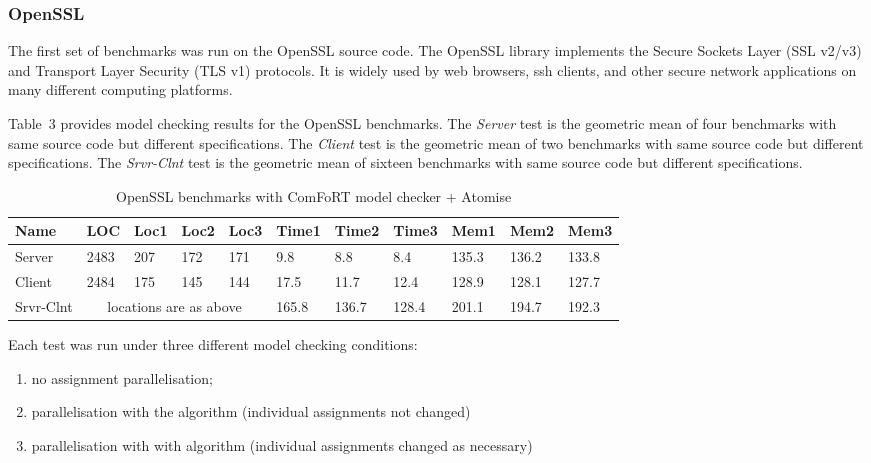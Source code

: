 \subsubsection{OpenSSL}

The first set of benchmarks was run on the OpenSSL source code.  The
OpenSSL library implements the Secure Sockets Layer (SSL v2/v3) and
Transport Layer Security (TLS v1) protocols. It is widely used by web
browsers, ssh clients, and other secure network applications on many
different computing platforms.

Table~3 provides model checking results for the OpenSSL
benchmarks.  The \emph{Server} test is the geometric mean of four
benchmarks with same source code but different specifications.  The
\emph{Client} test is the geometric mean of two benchmarks with same
source code but different specifications.  The \emph{Srvr-Clnt} test
is the geometric mean of sixteen benchmarks with same source code but
different specifications.

\begin{table}
\begin{scriptsize}
\begin{tabular}{|l|l|l|l|l|l|l|l|l|l|l|} \hline
Name & LOC & Loc1 & Loc2 & Loc3 & Time1 & Time2 & Time3 & Mem1 & Mem2
& Mem3 \\ \hline
Server & 2483 & 207 & 172 & 171 & 9.8 & 8.8 & 8.4 & 135.3 & 136.2 &
133.8\\ \hline
Client & 2484 & 175 & 145 & 144 & 17.5 & 11.7 & 12.4 & 128.9 & 128.1 &
127.7\\ \hline
Srvr-Clnt & \multicolumn{4}{|c|}{locations are as above} & 165.8 & 136.7
& 128.4 & 201.1 & 194.7 & 192.3\\ \hline
\end{tabular}
\label{openssl}
\caption{OpenSSL benchmarks with ComFoRT model checker + Atomise}
\end{scriptsize}
\end{table}

Each test was run under three different model checking conditions:

\begin{enumerate}
\item no assignment parallelisation;
\item parallelisation with the \atomizer{} algorithm (individual
  assignments not changed)
\item parallelisation with with \catomizer{} algorithm (individual
  assignments changed as necessary)
\end{enumerate}

